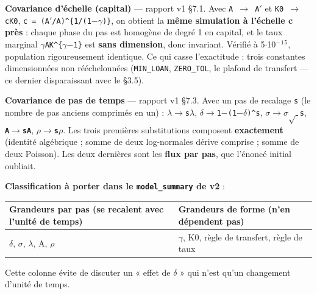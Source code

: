 \documentclass[11pt,a4paper]{article}
\newcommand{\code}[1]{\texttt{#1}}
\begin{document}
\textbf{Covariance d'échelle (capital)} --- rapport v1 §7.1. Avec \code{A \ensuremath{\rightarrow} A\ensuremath{'}} et \code{K0 \ensuremath{\rightarrow} cK0}, \code{c = (A\ensuremath{'}/A)\textasciicircum{}\{1/(1\ensuremath{-}\ensuremath{\gamma})\}}, on obtient la \textbf{même simulation à l'échelle c près} : chaque phase du pas est homogène de degré 1 en capital, et le taux marginal \code{\ensuremath{\gamma}AK\textasciicircum{}\{\ensuremath{\gamma}\ensuremath{-}1\}} est \textbf{sans dimension}, donc invariant. Vérifié à 5\ensuremath{\cdot}10\ensuremath{^-}\ensuremath{^1}\ensuremath{^5}, population rigoureusement identique. Ce qui casse l'exactitude : trois constantes dimensionnées non rééchelonnées (\code{MIN\_LOAN}, \code{ZERO\_TOL}, le plafond de transfert --- ce dernier disparaissant avec le §3.5).

\textbf{Covariance de pas de temps} --- rapport v1 §7.3. Avec un pas de recalage \code{s} (le nombre de pas anciens comprimés en un) : \code{\ensuremath{\lambda}\ensuremath{\rightarrow}s\ensuremath{\lambda}}, \code{\ensuremath{\delta}\ensuremath{\rightarrow}1\ensuremath{-}(1\ensuremath{-}\ensuremath{\delta})\textasciicircum{}s}, \code{\ensuremath{\sigma}\ensuremath{\rightarrow}\ensuremath{\sigma}\ensuremath{\sqrt{\;}}s}, \textbf{\code{A\ensuremath{\rightarrow}sA}}, \textbf{\code{\ensuremath{\rho}\ensuremath{\rightarrow}s\ensuremath{\rho}}}. Les trois premières substitutions composent \textbf{exactement} (identité algébrique ; somme de deux log-normales dérive comprise ; somme de deux Poisson). Les deux dernières sont les \textbf{flux par pas}, que l'énoncé initial oubliait.

\textbf{Classification à porter dans le \code{model\_summary} de v2} :

\begin{center}
\begin{tabularx}{\linewidth}{@{}XX@{}}
\toprule
\textbf{Grandeurs \textbf{par pas} (se recalent avec l'unité de temps)} & \textbf{Grandeurs \textbf{de forme} (n'en dépendent pas)} \\
\midrule
\ensuremath{\delta}, \ensuremath{\sigma}, \ensuremath{\lambda}, A, \ensuremath{\rho} & \ensuremath{\gamma}, K0, règle de transfert, règle de taux \\
\bottomrule
\end{tabularx}
\end{center}

Cette colonne évite de discuter un « effet de \ensuremath{\delta} » qui n'est qu'un changement d'unité de temps.
\end{document}
